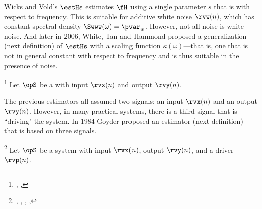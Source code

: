Wicks and Vold's $\estHs$ estimates $\fH$ using a single parameter $s$
that is  with respect to frequency.
This is suitable for additive white noise $\rvw(n)$, which has constant spectral density 
$\Swww(\omega)=\pvar_w$.
However, not all noise is white noise.
And later in 2006, White, Tan and Hammond proposed a generalization (next definition) of $\estHs$ with a scaling 
function $\kappa(\omega)$---that is, one that is not in general constant with respect to frequency
and is thus suitable in the presence of  noise.
\begin{definition}
\footnote{
  ,
  ,
  }
\label{def:Hkappa}
Let $\opS$ be a  with input $\rvx(n)$ and output $\rvy(n)$.
\end{definition}

The previous estimators all assumed two signals: an input $\rvx(n)$ and an output $\rvy(n)$.
However, in many practical systems, there is a third signal that is ``driving" the system.
In 1984 Goyder proposed an estimator (next definition) that is based on three signals.
\begin{definition}
\footnote{
  ,
  ,
  ,
  ,
  }
\label{def:Hc}
Let $\opS$ be a system with input $\rvx(n)$, output $\rvy(n)$, and a driver $\rvp(n)$.
\end{definition}

